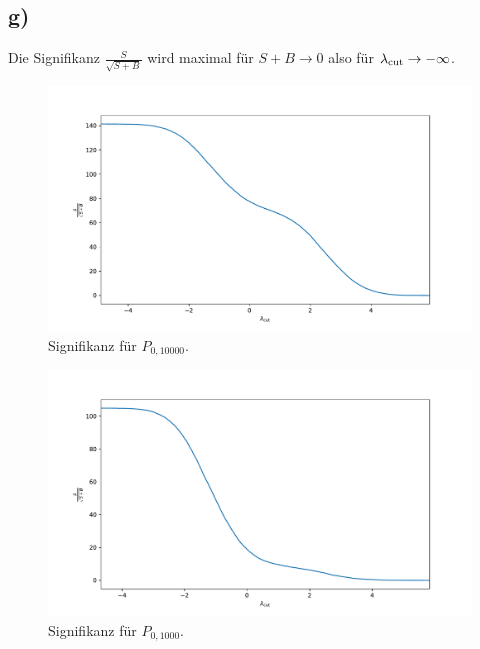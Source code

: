 \documentclass[a4paper, 11pt]{article}
\begin{document}
\subsection*{g)}
Die Signifikanz $\frac{S}{\sqrt{S + B}}$ wird maximal für $S + B \rightarrow 0$ also für $\lambda_\textup{cut} \rightarrow -\infty$.
\begin{figure}
    \centering
    \includegraphics[width=\textwidth]{../A16/A16g_10000.pdf}
    \caption{Signifikanz für $P_{0, 10000}$.}
    \label{fig:A16g_10000}
\end{figure}
\begin{figure}
    \centering
    \includegraphics[width=\textwidth]{../A16/A16g_1000.pdf}
    \caption{Signifikanz für $P_{0, 1000}$.}
    \label{fig:A16g_1000}
\end{figure}
\FloatBarrier
\end{document}
